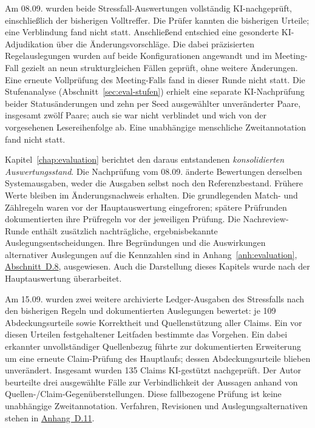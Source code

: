 Am 08.09. wurden beide Stressfall-Auswertungen vollständig
KI-nachgeprüft, einschließlich der bisherigen Volltreffer. Die
Prüfer kannten die bisherigen Urteile; eine Verblindung fand
nicht statt. Anschließend entschied eine gesonderte
KI-Adjudikation über die Änderungsvorschläge. Die dabei
präzisierten Regelauslegungen wurden auf beide Konfigurationen
angewandt und im Meeting-Fall gezielt an neun strukturgleichen
Fällen geprüft, ohne weitere Änderungen. Eine erneute
Vollprüfung des Meeting-Falls fand in dieser Runde nicht statt.
Die Stufenanalyse (Abschnitt~\ref{sec:eval-stufen}) erhielt
eine separate KI-Nachprüfung beider Statusänderungen und zehn
per Seed ausgewählter unveränderter Paare, insgesamt zwölf Paare;
auch sie war nicht verblindet und
wich von der vorgesehenen Lesereihenfolge ab. Eine unabhängige
menschliche Zweitannotation fand nicht statt.

Kapitel~\ref{chap:evaluation} berichtet den daraus entstandenen
\emph{konsolidierten Auswertungsstand}. Die Nachprüfung vom 08.09.
änderte Bewertungen derselben Systemausgaben, weder die Ausgaben
selbst noch den Referenzbestand. Frühere Werte bleiben im
Änderungsnachweis erhalten. Die grundlegenden Match- und
Zählregeln waren vor der Hauptauswertung eingefroren; spätere
Prüfrunden dokumentierten ihre Prüfregeln vor der jeweiligen
Prüfung. Die Nachreview-Runde enthält zusätzlich nachträgliche,
ergebnisbekannte Auslegungsentscheidungen. Ihre Begründungen und
die Auswirkungen alternativer Auslegungen auf die Kennzahlen
sind in Anhang~\ref{anh:evaluation},
\hyperref[anh:coverage-nachreview]{Abschnitt~D.8}, ausgewiesen.
Auch die Darstellung dieses Kapitels wurde nach der
Hauptauswertung überarbeitet.

Am 15.09. wurden zwei weitere archivierte Ledger-Ausgaben des
Stressfalls nach den bisherigen Regeln und dokumentierten
Auslegungen bewertet: je 109 Abdeckungsurteile sowie Korrektheit
und Quellenstützung aller Claims. Ein vor diesen Urteilen
festgehaltener Leitfaden bestimmte das Vorgehen. Ein dabei erkannter
unvollständiger Quellenbezug führte zur dokumentierten Erweiterung um eine
erneute Claim-Prüfung des Hauptlaufs; dessen Abdeckungsurteile blieben
unverändert. Insgesamt wurden 135 Claims KI-gestützt nachgeprüft.
Der Autor beurteilte drei ausgewählte Fälle zur Verbindlichkeit der Aussagen anhand von
Quellen-/Claim-Gegenüberstellungen. Diese fallbezogene Prüfung ist
keine unabhängige Zweitannotation. Verfahren, Revisionen und
Auslegungsalternativen stehen in
\hyperref[anh:ledger-wiederholungen]{Anhang~D.11}.

